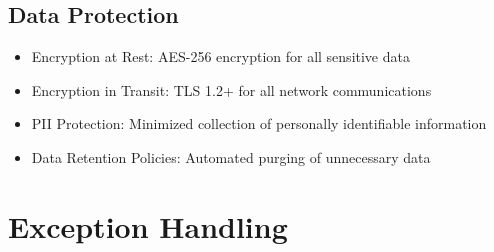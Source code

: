 \documentclass[a4paper, 11pt]{scrreprt}
\begin{document}
\subsection{Data Protection}
\begin{itemize}
    \item Encryption at Rest: AES-256 encryption for all sensitive data
    \item Encryption in Transit: TLS 1.2+ for all network communications
    \item PII Protection: Minimized collection of personally identifiable information
    \item Data Retention Policies: Automated purging of unnecessary data
\end{itemize}

\section{Exception Handling}
\end{document}
